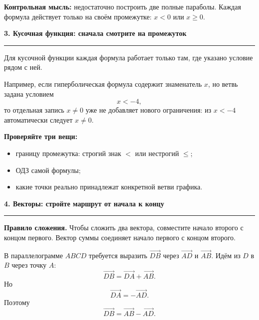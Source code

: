 \documentclass[a4paper,12pt]{article}
\newcommand{\sectiontitle}[1]{%
  \vspace{2mm}%
  {\Large\bfseries\color{darkaccent}#1}\par\vspace{2mm}%
  {\color{accent!55}\rule{\linewidth}{0.6pt}}\par\vspace{2mm}%
}
\newcommand{\keyidea}[1]{\textbf{\color{darkaccent}#1}}
\newcommand{\vect}[2]{\overrightarrow{#1#2}}
\begin{document}
\keyidea{Контрольная мысль:} недостаточно построить две полные параболы. Каждая формула действует только на своём промежутке: $x<0$ или $x\ge0$.

\clearpage

\sectiontitle{3. Кусочная функция: сначала смотрите на промежуток}

Для кусочной функции каждая формула работает только там, где указано условие рядом с ней.

Например, если гиперболическая формула содержит знаменатель $x$, но ветвь задана условием
\[
x<-4,
\]
то отдельная запись $x\ne0$ уже не добавляет нового ограничения: из $x<-4$ автоматически следует $x\ne0$.

\textbf{Проверяйте три вещи:}
\begin{itemize}
  \item границу промежутка: строгий знак $<$ или нестрогий $\le$;
  \item ОДЗ самой формулы;
  \item какие точки реально принадлежат конкретной ветви графика.
\end{itemize}

\vspace{4mm}
\sectiontitle{4. Векторы: стройте маршрут от начала к концу}

\keyidea{Правило сложения.} Чтобы сложить два вектора, совместите начало второго с концом первого. Вектор суммы соединяет начало первого с концом второго.

В параллелограмме $ABCD$ требуется выразить $\vect{D}{B}$ через $\vect{A}{D}$ и $\vect{A}{B}$. Идём из $D$ в $B$ через точку $A$:
\[
\vect{D}{B}=\vect{D}{A}+\vect{A}{B}.
\]
Но
\[
\vect{D}{A}=-\vect{A}{D}.
\]
Поэтому
\[
\boxed{\vect{D}{B}=\vect{A}{B}-\vect{A}{D}}.
\]

\begin{center}
\end{center}
\end{document}
